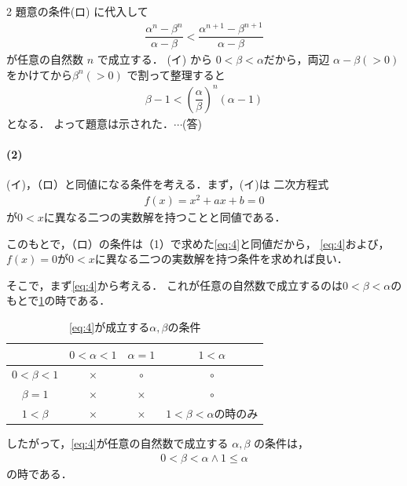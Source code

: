 \documentclass[../../main.tex]{subfiles}
\begin{document}
\begin{multicols}{2}
  題意の条件(ロ) に代入して
  \begin{align}
    \dfrac{\alpha^n - \beta^n}{\alpha - \beta} < \dfrac{\alpha^{n+1} - \beta^{n+1}}{\alpha - \beta}
  \end{align}
  が任意の自然数 $n$ で成立する．
  (イ) から $0 < \beta < \alpha$だから，両辺 $\alpha-\beta (>0)$ をかけてから$\beta^n (>0)$ で割って整理すると
  \begin{align}
    \beta - 1 < \left(\dfrac{\alpha}{\beta}\right)^n (\alpha - 1) \label{eq:4}
  \end{align}
  となる．
  よって題意は示された．$\cdots$(答)

  \paragraph{(2)}
  (イ)，（ロ）と同値になる条件を考える．まず，(イ)は
  二次方程式
  \begin{align}
    f(x) = x^2+ax+b =0
  \end{align}
  が$0<x$に異なる二つの実数解を持つことと同値である．

  このもとで，（ロ）の条件は（1）で求めた\cref{eq:4}と同値だから，
  \cref{eq:4}および，$f(x)=0$が$0<x$に異なる二つの実数解を持つ条件を求めれば良い．

  そこで，まず\cref{eq:4}から考える．
  これが任意の自然数で成立するのは$0<\beta<\alpha$のもとで\cref{1995-1:table:1}の時である．
  \begin{table}[H]
    \centering
    \caption{\cref{eq:4}が成立する$\alpha,\beta$の条件}
    \label{1995-1:table:1}
    \begin{tabular}{|c|c|c|c|}
      \hline
      & $0 < \alpha < 1$ & $\alpha = 1$ & $1 < \alpha$         \\
      \hline
      $0 < \beta < 1$ & $\times$         & $\circ$      & $\circ$              \\
      \hline
      $\beta = 1$     & $\times$         & $\times$     & $\circ$              \\
      \hline
      $1 < \beta$     & $\times$         & $\times$     & $1<\beta<\alpha$の時のみ \\
      \hline
    \end{tabular}
  \end{table}

  したがって，\cref{eq:4}が任意の自然数で成立する $\alpha, \beta$ の条件は，
  \begin{align}
    0 < \beta < \alpha \land 1 \le \alpha
  \end{align}
  の時である．


\end{multicols}
\end{document}
